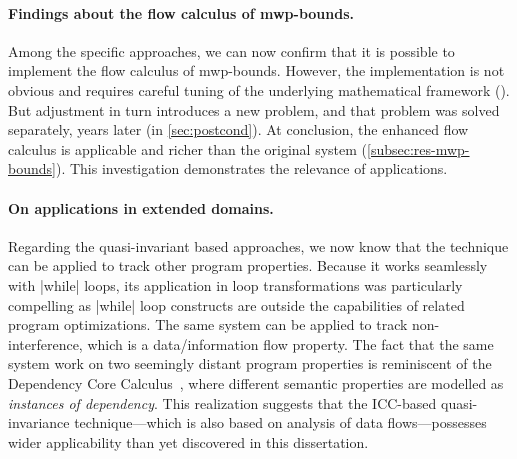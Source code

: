 \paragraph*{Findings about the flow calculus of mwp-bounds.}
Among the specific approaches, we can now confirm that it is possible to implement the flow calculus of mwp-bounds.
However, the implementation is not obvious and requires careful tuning of the underlying mathematical framework ().
But adjustment in turn introduces a new problem, and that problem was solved separately, years later (in \autoref{sec:postcond}).
At conclusion, the enhanced flow calculus is applicable and richer than the original system (\cf\autoref{subsec:res-mwp-bounds}).
This investigation demonstrates the relevance of applications.

\paragraph*{On applications in extended domains.}
Regarding the quasi-invariant based approaches, we now know that the technique can be applied to track other program properties.
Because it works seamlessly with \pr|while| loops, its application in loop transformations was particularly compelling as
\pr|while| loop constructs are outside the capabilities of related program optimizations.
The same system can be applied to track non-interference, which is a data/information flow property.
The fact that the same system work on two seemingly distant program properties is reminiscent of the Dependency Core Calculus~\cite{abadi1999b},
where different semantic properties are modelled as \emph{instances of dependency}.
This realization suggests that the ICC-based quasi-invariance technique---which is also based on analysis of data flows---possesses wider applicability than yet discovered in this dissertation.

